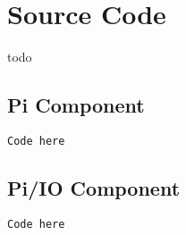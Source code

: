 \chapter{Source Code}

todo 

\section{Pi Component}


\begin{lstlisting}[frame=single,label={code:pi}]
Code here
\end{lstlisting}


\section{Pi/IO Component}
\begin{lstlisting}[frame={single},label={code:pi-io}]
Code here
\end{lstlisting}

